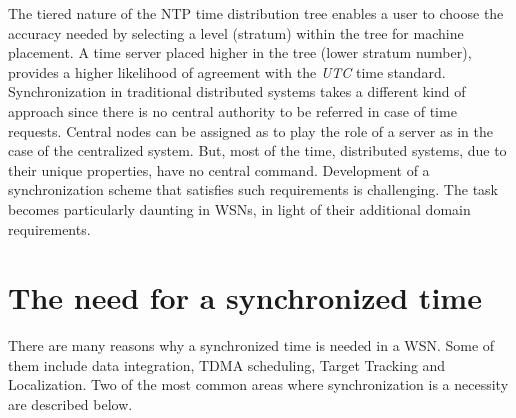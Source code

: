 \documentclass[a4paper,10pt]{report}
\begin{document}
\newline
The tiered nature of the NTP time distribution tree enables a user to choose the accuracy needed by selecting a level (stratum) within
the tree for machine placement. A time server placed higher in the tree (lower stratum number), provides a higher likelihood of
agreement with the \textit{UTC} time standard.
\newline
Synchronization in traditional distributed systems takes a different kind of approach since there is no central authority to be referred
in case of time requests. Central nodes can be assigned as to play the role of a server as in the case of the centralized system.
But, most of the time, distributed systems, due to their unique properties, have no central command. Development of a synchronization
scheme that satisfies such requirements is challenging. The task becomes particularly daunting in WSNs, in light of their additional
domain requirements. 
\section{\textbf{The need for a synchronized time}}
There are many reasons why a synchronized time is needed in a WSN. Some of them include data integration, TDMA scheduling, Target
Tracking and Localization. Two of the most common areas where synchronization is a necessity are described below. 
\end{document}
